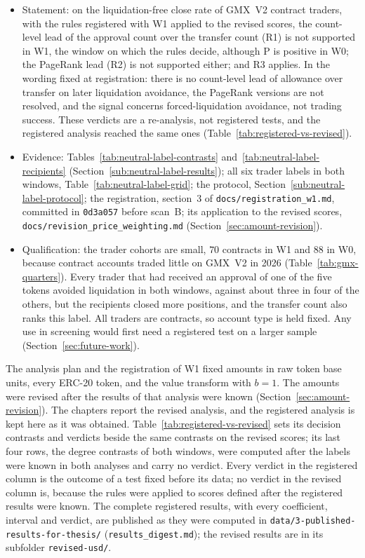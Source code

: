 \begin{itemize}
\item Statement: on the liquidation-free close rate of GMX~V2 contract traders, with the rules registered with W1 applied to the revised scores, the count-level lead of the approval count over the transfer count (R1) is not supported in W1, the window on which the rules decide, although P is positive in W0; the PageRank lead (R2) is not supported either; and R3 applies. In the wording fixed at registration: there is no count-level lead of allowance over transfer on later liquidation avoidance, the PageRank versions are not resolved, and the signal concerns forced-liquidation avoidance, not trading success. These verdicts are a re-analysis, not registered tests, and the registered analysis reached the same ones (Table~\ref{tab:registered-vs-revised}).
\item Evidence: Tables~\ref{tab:neutral-label-contrasts} and~\ref{tab:neutral-label-recipients} (Section~\ref{sub:neutral-label-results}); all six trader labels in both windows, Table~\ref{tab:neutral-label-grid}; the protocol, Section~\ref{sub:neutral-label-protocol}; the registration, section~3 of \texttt{docs/registration\_w1.md}, committed in \texttt{0d3a057} before scan~B; its application to the revised scores, \texttt{docs/revision\_price\_weighting.md} (Section~\ref{sec:amount-revision}).
\item Qualification: the trader cohorts are small, $70$ contracts in W1 and $88$ in W0, because contract accounts traded little on GMX~V2 in 2026 (Table~\ref{tab:gmx-quarters}). Every trader that had received an approval of one of the five tokens avoided liquidation in both windows, against about three in four of the others, but the recipients closed more positions, and the transfer count also ranks this label. All traders are contracts, so account type is held fixed. Any use in screening would first need a registered test on a larger sample (Section~\ref{sec:future-work}).
\end{itemize}


The analysis plan and the registration of W1 fixed amounts in raw token base units, every ERC-20 token, and the value transform with $b=1$. The amounts were revised after the results of that analysis were known (Section~\ref{sec:amount-revision}). The chapters report the revised analysis, and the registered analysis is kept here as it was obtained. Table~\ref{tab:registered-vs-revised} sets its decision contrasts and verdicts beside the same contrasts on the revised scores; its last four rows, the degree contrasts of both windows, were computed after the labels were known in both analyses and carry no verdict. Every verdict in the registered column is the outcome of a test fixed before its data; no verdict in the revised column is, because the rules were applied to scores defined after the registered results were known. The complete registered results, with every coefficient, interval and verdict, are published as they were computed in \texttt{data/3-published-results-for-thesis/} (\texttt{results\_digest.md}); the revised results are in its subfolder \texttt{revised-usd/}.

